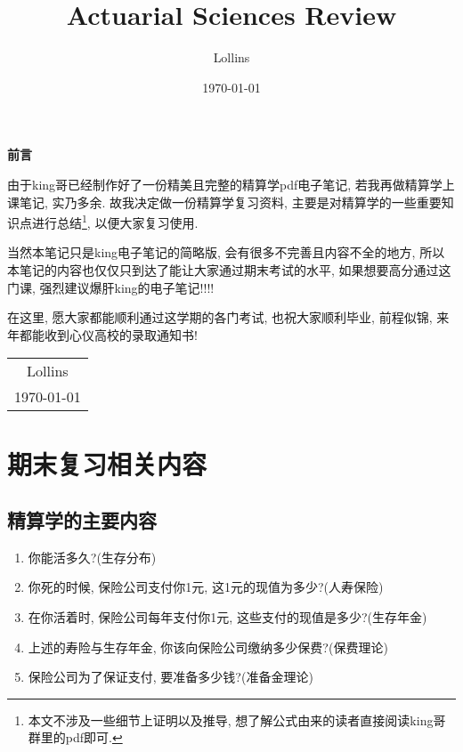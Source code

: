 \documentclass[lang=cn,10pt]{elegantbook}
\title{Actuarial Sciences Review}
\author{Lollins}
\institute{安徽师范大学数学与统计学院}
\date{\today}
\begin{document}
\maketitle

\begin{center}
	\Huge\textbf{前言}
\end{center}
\par
由于king哥已经制作好了一份精美且完整的精算学pdf电子笔记, 若我再做精算学上课笔记, 实乃多余. 故我决定做一份精算学复习资料, 主要是对精算学的一些重要知识点进行总结\footnote{本文不涉及一些细节上证明以及推导, 想了解公式由来的读者直接阅读king哥群里的pdf即可. }, 以便大家复习使用. 

当然本笔记只是king电子笔记的简略版, 会有很多不完善且内容不全的地方, 所以本笔记的内容也仅仅只到达了能让大家通过期末考试的水平, 如果想要高分通过这门课, 强烈建议爆肝king的电子笔记!!!!

在这里, 愿大家都能顺利通过这学期的各门考试, 也祝大家顺利毕业, 前程似锦, 来年都能收到心仪高校的录取通知书!

\begin{flushright}
	\begin{tabular}{c}
		Lollins \\
		\today
	\end{tabular}
\end{flushright}

\newpage
{}
\setcounter{page}{1}
\tableofcontents
\newpage
\setcounter{page}{1}

\chapter*{期末复习相关内容}
\section*{精算学的主要内容}
\begin{enumerate}
    \item 你能活多久?(生存分布)
    \item 你死的时候, 保险公司支付你1元, 这1元的现值为多少?(人寿保险)
    \item 在你活着时, 保险公司每年支付你1元, 这些支付的现值是多少?(生存年金)
    \item 上述的寿险与生存年金, 你该向保险公司缴纳多少保费?(保费理论)
    \item 保险公司为了保证支付, 要准备多少钱?(准备金理论)
\end{enumerate}
\end{document}
